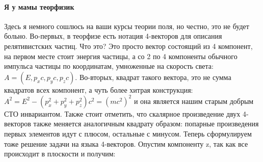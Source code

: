 \documentclass[12pt]{article}
\begin{document}
\paragraph{Я у мамы теорфизик} Здесь я немного сошлюсь на ваши курсы теории поля, но честно, это не будет больно. Во-первых, в теорфизе есть нотация 4-векторов для описания релятивистских частиц. Что это? Это просто вектор состоящий из 4 компонент, на первом месте стоит энергия частицы, а со 2 по 4 компоненты обычного импульса частицы по координатам, умноженные на скорость света: $A = (E, p_xc, p_yc, p_zc)$. Во-вторых, квадрат такого вектора, это не сумма квадратов всех компонент, а чуть более хитрая конструкция: $A^2 = E^2 -(p_x^2+p_y^2+p_z^2)c^2 = (mc^2)^2$ и она является нашим старым добрым СТО инвариантом. Также стоит отметить, что скалярное произведение двух 4-векторов также меняется аналогичным квадрату образом: попарные произведения первых элементов идут с плюсом, остальные с минусом. Теперь сформулируем тоже решение задачи на языка 4-векторов. Опустим компоненту z, так как все происходит в плоскости и получим:
\end{document}
